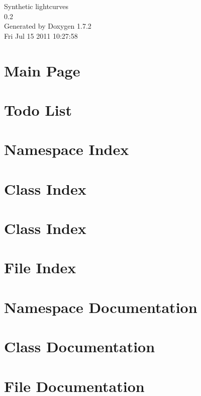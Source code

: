 \documentclass[a4paper]{book}
\begin{document}
\hypersetup{pageanchor=false}
\begin{titlepage}
\vspace*{7cm}
\begin{center}
{\Large Synthetic lightcurves \\[1ex]\large 0.2 }\\
\vspace*{1cm}
{\large Generated by Doxygen 1.7.2}\\
\vspace*{0.5cm}
{\small Fri Jul 15 2011 10:27:58}\\
\end{center}
\end{titlepage}
\clearemptydoublepage
{}
\tableofcontents
\clearemptydoublepage
{}
\hypersetup{pageanchor=true}
\chapter{Main Page}
\label{index}\hypertarget{index}{}
\chapter{Todo List}
\label{todo}
\hypertarget{todo}{}

\chapter{Namespace Index}

\chapter{Class Index}

\chapter{Class Index}

\chapter{File Index}

\chapter{Namespace Documentation}

\chapter{Class Documentation}







\chapter{File Documentation}













\printindex
\end{document}
